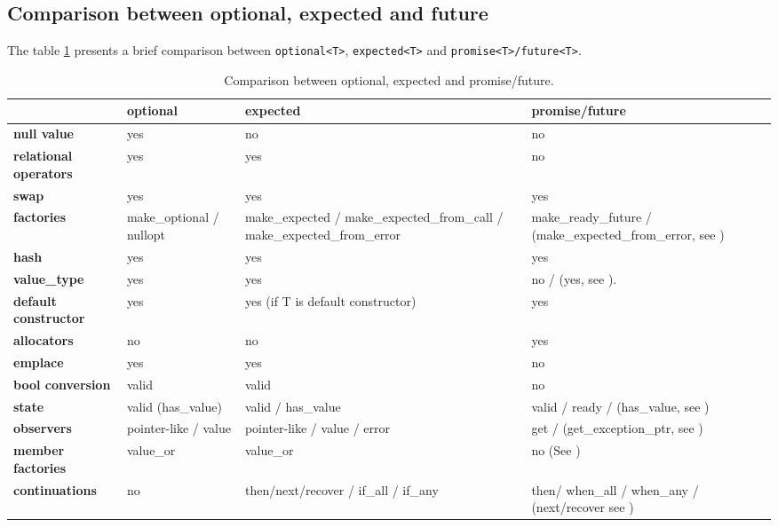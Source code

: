 \documentclass[a4paper,10pt]{article}
\newcommand{\cpp}[1]{\lstinline{#1}}
\begin{document}
\subsection{Comparison between optional, expected and future}

The table \ref{comp-monads} presents a brief comparison between \cpp{optional<T>}, \cpp{expected<T>}  and \cpp{promise<T>/future<T>}.

\begin{table}
\bgroup
\def\arraystretch{1.5}
\begin{tabular}{|l|>{\raggedright\arraybackslash}p{4cm}|>{\raggedright\arraybackslash}p{4cm}|>{\raggedright\arraybackslash}p{4cm}|}
\hline
                    & \textbf{optional} & \textbf{expected} & \textbf{promise/future} \\
\hline
\textbf{null value} & yes & no & no \\
\hline
\textbf{relational operators} & yes & yes & no \\
\hline
\textbf{swap} & yes & yes & yes \\
\hline
\textbf{factories} & make_optional / nullopt & make_expected / make_expected_from_call / make_expected_from_error & make_ready_future / (make_expected_from_error, see \cite{MoreAsync}) \\
\hline
\textbf{hash} & yes & yes & yes \\
\hline
\textbf{value_type} & yes & yes & no / (yes, see \cite{MoreAsync}).  \\
\hline
\textbf{default constructor} & yes & yes (if T is default constructor) & yes \\
\hline
\textbf{allocators} & no & no & yes \\
\hline
\textbf{emplace} & yes & yes & no \\
\hline
\textbf{bool conversion} & valid & valid & no \\
\hline
\textbf{state} & valid (has_value) & valid / has_value & valid / ready / (has_value, see \cite{MoreAsync}) \\
\hline
\textbf{observers} & pointer-like / value & pointer-like / value / error & get / (get_exception_ptr, see \cite{MoreAsync}) \\
\hline
\textbf{member factories} & value_or & value_or & no (See \cite{MoreAsync}) \\
\hline
\textbf{continuations} & no & then/next/recover / if_all / if_any & then/ when_all / when_any / (next/recover see \cite{MoreAsync}) \\
\hline
\end{tabular}
\egroup
\caption{Comparison between optional, expected and promise/future.}
\label{comp-monads}
\end{table}
\end{document}
